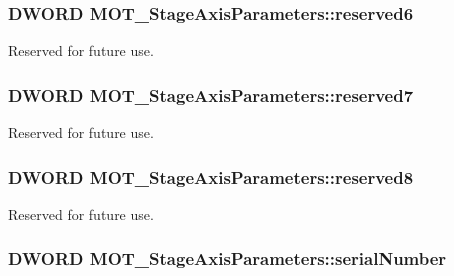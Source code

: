 \subsubsection[{\texorpdfstring{reserved6}{reserved6}}]{\setlength{\rightskip}{0pt plus 5cm}D\+W\+O\+RD M\+O\+T\+\_\+\+Stage\+Axis\+Parameters\+::reserved6}\hypertarget{struct_m_o_t___stage_axis_parameters_af716ca04f14b6f4a7d065f4f8a43e3c9}{}\label{struct_m_o_t___stage_axis_parameters_af716ca04f14b6f4a7d065f4f8a43e3c9}


Reserved for future use. 

\subsubsection[{\texorpdfstring{reserved7}{reserved7}}]{\setlength{\rightskip}{0pt plus 5cm}D\+W\+O\+RD M\+O\+T\+\_\+\+Stage\+Axis\+Parameters\+::reserved7}\hypertarget{struct_m_o_t___stage_axis_parameters_aed3853fc3a8d4cf881474e441814f2d4}{}\label{struct_m_o_t___stage_axis_parameters_aed3853fc3a8d4cf881474e441814f2d4}


Reserved for future use. 

\subsubsection[{\texorpdfstring{reserved8}{reserved8}}]{\setlength{\rightskip}{0pt plus 5cm}D\+W\+O\+RD M\+O\+T\+\_\+\+Stage\+Axis\+Parameters\+::reserved8}\hypertarget{struct_m_o_t___stage_axis_parameters_a3ad1382c247a3acc06ee643d57d44e55}{}\label{struct_m_o_t___stage_axis_parameters_a3ad1382c247a3acc06ee643d57d44e55}


Reserved for future use. 

\subsubsection[{\texorpdfstring{serial\+Number}{serialNumber}}]{\setlength{\rightskip}{0pt plus 5cm}D\+W\+O\+RD M\+O\+T\+\_\+\+Stage\+Axis\+Parameters\+::serial\+Number}\hypertarget{struct_m_o_t___stage_axis_parameters_ad6d70738cafacd9481252a9100a5b7d4}{}\label{struct_m_o_t___stage_axis_parameters_ad6d70738cafacd9481252a9100a5b7d4}


